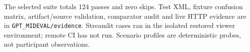 The selected suite totals 124 passes and zero skips. Test XML, fixture confusion matrix, artifact/source validation, comparator audit and live HTTP evidence are in \texttt{GPT\_MIDEVAL/evidence}. Streamlit cases ran in the isolated restored viewer environment; remote CI has not run. Scenario profiles are deterministic probes, not participant observations.
